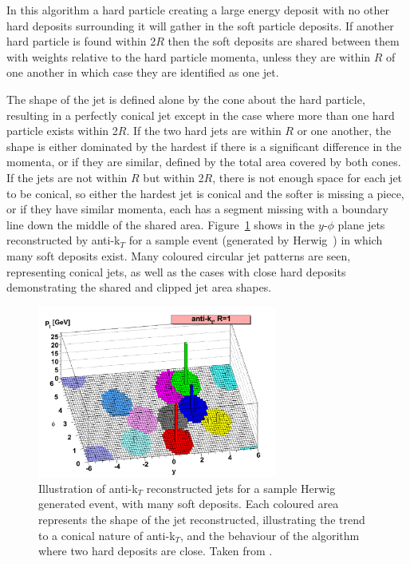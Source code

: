 In this algorithm a hard particle creating a large energy deposit with no other hard deposits surrounding it will gather in the soft particle deposits. If another hard particle is found within 2$R$ then the soft deposits are shared between them with weights relative to the hard particle momenta, unless they are within $R$ of one another in which case they are identified as one jet. 

The shape of the jet is defined alone by the cone about the hard particle, resulting in a perfectly conical jet except in the case where more than one hard particle exists within 2$R$. If the two hard jets are within $R$ or one another, the shape is either dominated by the hardest if there is a significant difference in the momenta, or if they are similar, defined by the total area covered by both cones. If the jets are not within $R$ but within 2$R$, there is not enough space for each jet to be conical, so either the hardest jet is conical and the softer is missing a piece, or if they have similar momenta, each has a segment missing with a boundary line down the middle of the shared area. Figure~\ref{fig:akt} shows in the $y$-$\phi$ plane jets reconstructed by anti-k$_{T}$ for a sample event (generated by Herwig~\cite{HERWIG}) in which many soft deposits exist. Many coloured circular jet patterns are seen, representing conical jets, as well as the cases with close hard deposits demonstrating the shared and clipped jet area shapes. 

\begin{figure}
\centering
\includegraphics[width=0.7\textwidth]{Figures/Objects/akt}
\caption[Illustration of anti-k_${T}$ reconstructed jets for a sample Herwig generated event, with many soft deposits.]{\label{fig:akt}Illustration of anti-k$_{T}$ reconstructed jets for a sample Herwig generated event, with many soft deposits. Each coloured area represents the shape of the jet reconstructed, illustrating the trend to a conical nature of anti-k$_{T}$, and the behaviour of the algorithm where two hard deposits are close. Taken from \cite{akt}.}
\end{figure}


